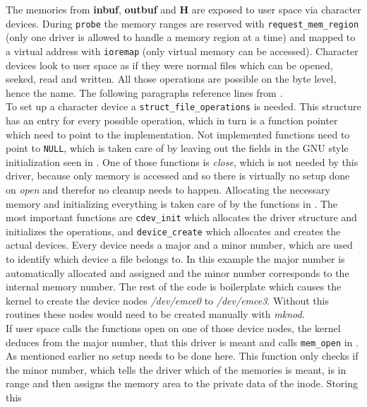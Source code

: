 \documentclass[11pt,technote,a4paper,onecolumn,dvips]{IEEEtran}
\newcommand{\module}[1]{{\ttfamily\bfseries #1}}
\begin{document}
The memories from \module{inbuf}, \module{outbuf} and \module{H} are exposed
to user space via character devices\cite[p. 42ff]{ldd}. During
\lstinline+probe+ the memory ranges are reserved with
\lstinline+request_mem_region+\cite[p. 249]{ldd} (only one driver is allowed
to handle a memory region at a time) and mapped to a virtual address with
\lstinline+ioremap+\cite[p. 250]{ldd} (only virtual memory can be accessed).
Character devices look to user space as if they were normal files which can
be opened, seeked, read and written. All those operations are possible on
the byte level, hence the name. The following paragraphs reference lines from
.\\
To set up a character device a
\lstinline+struct_file_operations+\cite[p. 54]{ldd} is needed. This structure
has an entry for every possible operation, which in turn is a function pointer
which need to point to the implementation. Not implemented functions need to
point to \lstinline+NULL+, which is taken care of by leaving out the fields
in the GNU style initialization seen in . One of those functions
is \emph{close}, which is not needed by this driver, because only memory is
accessed and so there is virtually no setup done on \emph{open} and therefor
no cleanup needs to happen. Allocating the necessary
memory and initializing everything is taken care of by the functions in
. The most important functions are
\lstinline+cdev_init+\cite[p. 56]{ldd} which allocates the driver structure
and initializes the operations, and \lstinline+device_create+ which allocates
and creates the actual devices. Every device needs a major and a minor number,
which are used to identify which device a file belongs to. In this example the
major number is automatically allocated and assigned and the minor number
corresponds to the internal memory number. The rest of the code is boilerplate
which causes the kernel to create the device nodes \emph{/dev/emce0} to
\emph{/dev/emce3}. Without this routines these nodes would need to be created
manually with \emph{mknod}.\\
If user space calls the functions open on one of those device nodes, the
kernel deduces from the major number, that this driver is meant and calls
\lstinline+mem_open+ in . As mentioned earlier no setup needs
to be done here. This function only checks if the minor number, which tells
the driver which of the memories is meant, is in range and then assigns the
memory area to the private data of the inode\cite[p. 54]{ldd}. Storing this
\end{document}
